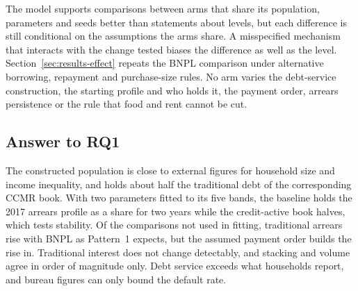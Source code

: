 The model supports comparisons between arms that share its population,
parameters and seeds better than statements about levels, but each difference is still
conditional on the assumptions the arms share. A misspecified mechanism that interacts with the
change tested biases the difference as well as the level. Section~\ref{sec:results-effect} repeats the
\ac{BNPL} comparison under alternative borrowing, repayment and purchase-size rules. No arm
varies the debt-service construction, the starting profile and who holds it, the payment order,
arrears persistence or the rule that food and rent cannot be cut.

\clearpage
\subsection{Answer to RQ1}
\label{sec:calibration-answer}

The constructed population is close to external figures for household size and income inequality,
and holds about half
the traditional debt of the corresponding \ac{CCMR} book. With two parameters fitted to its five
bands, the baseline holds the 2017 arrears profile as a share for two years while the
credit-active book halves, which tests stability. Of the comparisons not used in fitting, traditional arrears rise
with \ac{BNPL} as Pattern~1 expects, but the assumed payment order builds the rise in.
Traditional interest does not change detectably, and stacking and volume agree in order of
magnitude only. Debt service exceeds what households report, and bureau figures can only bound
the default rate.
